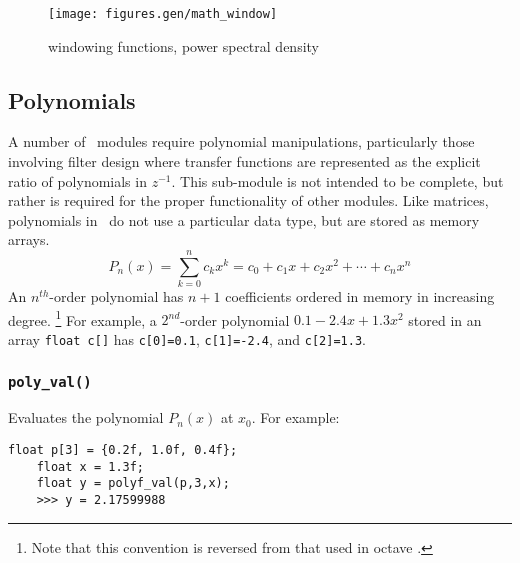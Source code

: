 \begin{figure}
\centering
  \texttt{[image: figures.gen/math\_window]}
\caption{windowing functions, power spectral density}
\label{fig:module:math:window}
\end{figure}

\subsection{Polynomials}
A number of \liquid\ modules require polynomial manipulations, particularly
those involving filter design where transfer functions are represented as the
explicit ratio of polynomials in $z^{-1}$.
This sub-module is not intended to be complete, but rather is required for
the proper functionality of other modules.
Like matrices, polynomials in \liquid\ do not use a particular data type, but
are stored as memory arrays.
\[
    P_n(x) = \sum_{k=0}^{n}{c_k x^k}
           = c_0 + c_1 x + c_2 x^2 + \cdots + c_n x^n
\]
An $n^{th}$-order polynomial has $n+1$ coefficients ordered in memory in
increasing degree.%
\footnote{Note that this convention is reversed from that used in octave
\cite{octave:web}.}
For example, a $2^{nd}$-order polynomial $0.1 -2.4x + 1.3x^2$ stored in an
array {\tt float c[]} has
{\tt c[0]=0.1},
{\tt c[1]=-2.4}, and
{\tt c[2]=1.3}.

\subsubsection{{\tt poly\_val()}}
\label{module:math:poly:polyf_val}
Evaluates the polynomial $P_n(x)$ at $x_0$.
For example:
\begin{Verbatim}[fontsize=\small]
    float p[3] = {0.2f, 1.0f, 0.4f};
    float x = 1.3f;
    float y = polyf_val(p,3,x);
    >>> y = 2.17599988
\end{Verbatim}

